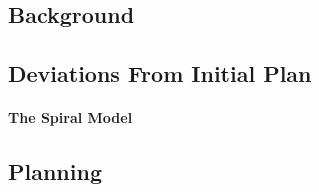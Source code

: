 
\subsection{Background}


\subsection{Deviations From Initial Plan}
\label{sec:devi-from-init-pln}


\paragraph{The Spiral Model}
\label{sec:spiral-model}


\subsection{Planning}
\label{sec:planning}


